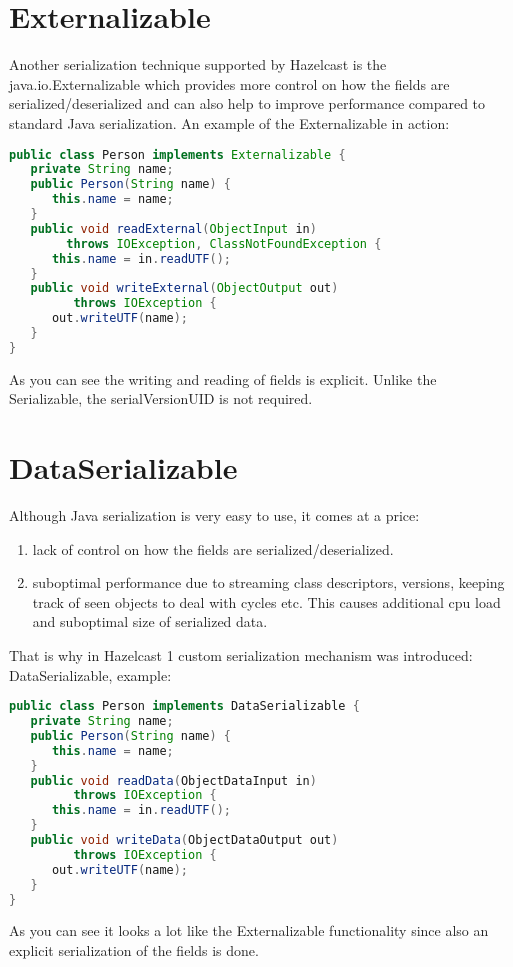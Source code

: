 \section{Externalizable}
Another serialization technique supported by Hazelcast is the java.io.Externalizable which provides more control on how the fields are serialized/deserialized and can also help to improve performance compared to standard Java serialization. An example of the Externalizable in action:
\begin{lstlisting}[language=java]
public class Person implements Externalizable {
   private String name;
   public Person(String name) {
      this.name = name;
   }
   public void readExternal(ObjectInput in) 
        throws IOException, ClassNotFoundException {
      this.name = in.readUTF();
   }
   public void writeExternal(ObjectOutput out) 
         throws IOException {
      out.writeUTF(name);
   }
}
\end{lstlisting}
As you can see the writing and reading of fields is explicit. Unlike the Serializable, the serialVersionUID is not required.

\section{DataSerializable}
Although Java serialization is very easy to use, it comes at a price:
\begin{enumerate}
\item lack of control on how the fields are serialized/deserialized.
\item suboptimal performance due to streaming class descriptors, versions, keeping track of seen objects to deal with cycles etc. This causes additional cpu load and suboptimal size of serialized data.
\end{enumerate}
That is why in Hazelcast 1 custom serialization mechanism was introduced: DataSerializable, example:
\begin{lstlisting}[language=java]
public class Person implements DataSerializable {
   private String name;
   public Person(String name) {
      this.name = name;
   }
   public void readData(ObjectDataInput in) 
         throws IOException {
      this.name = in.readUTF();
   }
   public void writeData(ObjectDataOutput out) 
         throws IOException {
      out.writeUTF(name);
   }
}
\end{lstlisting}
As you can see it looks a lot like the Externalizable functionality since also an explicit serialization of the fields is done. 

